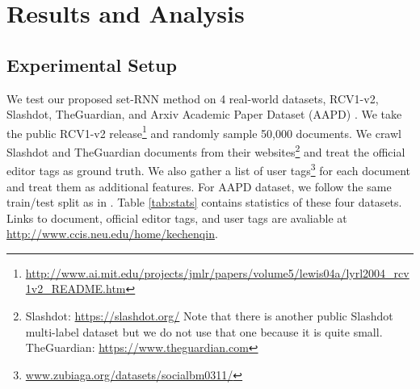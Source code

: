 \section{Results and Analysis}
\label{sec:results}
\subsection{Experimental Setup}

We test our proposed set-RNN method on 4 real-world datasets, RCV1-v2, Slashdot, TheGuardian, and Arxiv Academic Paper Dataset (AAPD) \cite{DBLP:journals/corr/abs-1806-04822}. We take the public RCV1-v2 release\footnote{\scriptsize\url{http://www.ai.mit.edu/projects/jmlr/papers/volume5/lewis04a/lyrl2004_rcv1v2_README.htm}} and randomly sample 50,000 documents. We crawl Slashdot and TheGuardian documents from their websites\footnote{\scriptsize Slashdot: \url{https://slashdot.org/} Note that there is another public Slashdot multi-label dataset \cite{read2009classifier} but we do not use that one because it is quite small. TheGuardian: \url{https://www.theguardian.com} 
} and treat the official editor tags as ground truth. We also gather a list of user tags\footnote{\scriptsize \url{www.zubiaga.org/datasets/socialbm0311/}} for each document and treat them as additional features. For AAPD dataset, we follow the same train/test split as in \cite{DBLP:journals/corr/abs-1806-04822}. Table \ref{tab:stats} contains statistics of these four datasets. Links to document, official editor tags, and user tags are avaliable at \url{http://www.ccis.neu.edu/home/kechenqin}. 
\begin{table}[h]
\caption{\fontsize{10}{12}\selectfont Statistics of the datasets.}\label{tab:stats}
\end{table}


